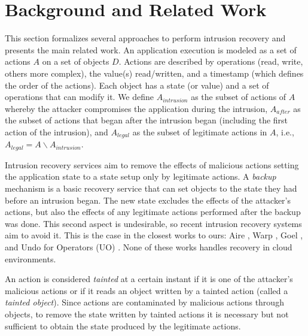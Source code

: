 
\section{Background and Related Work}\label{sec:background}

This section formalizes several approaches to perform intrusion recovery and presents the main related work. 
%
An application execution is modeled as a set of actions $A$ on a set of objects $D$. Actions are described by operations (read, write, others more complex), the value(s) read/written, and a timestamp (which defines the order of the actions). Each object has a state (or value) and a set of operations that can modify it. We define $A_{intrusion}$ as the subset of actions of $A$ whereby the attacker compromises the application during the intrusion, $A_{after}$ as the subset of actions that began after the intrusion began (including the first action of the intrusion), and $A_{legal}$ as the subset of legitimate actions in $A$, i.e., $A_{legal} = A \backslash A_{intrusion}$.

Intrusion recovery services aim to remove the effects of malicious actions setting the application state to a state setup only by legitimate actions. 
%
A \textit{backup} mechanism is a basic recovery service that can set objects to the state they had before an intrusion began. The new state excludes the effects of the attacker's actions, but also the effects of any legitimate actions performed after the backup was done. This second aspect is undesirable, so recent intrusion recovery systems aim to avoid it.
%
This is the case in the closest works to ours: Aire \cite{aire}, Warp \cite{warp}, Goel \cite{Akkus2010}, and Undo for Operators (UO) \cite{undoForOperators}. None of these works handles recovery in cloud environments.

An action is considered \textit{tainted} at a certain instant if it is one of the attacker's malicious actions or if it reads an object written by a tainted action (called a \textit{tainted object}). Since actions are contaminated by malicious actions through objects, to remove the state written by tainted actions it is necessary but not sufficient to obtain the state produced by the legitimate actions. 

